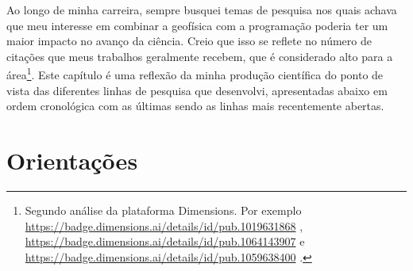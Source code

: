 \documentclass[10pt,a4paper,oneside]{book}
\begin{document}
Ao longo de minha carreira, sempre busquei temas de pesquisa nos quais achava
que meu interesse em combinar a geofísica com a programação poderia ter um
maior impacto no avanço da ciência.
Creio que isso se reflete no número de citações que meus trabalhos geralmente
recebem, que é considerado alto para a área\footnote{Segundo análise da
  plataforma Dimensions. Por exemplo
  \url{https://badge.dimensions.ai/details/id/pub.1019631868} \citep{Uieda2012},
  \url{https://badge.dimensions.ai/details/id/pub.1064143907} \citep{Uieda2016} e
  \url{https://badge.dimensions.ai/details/id/pub.1059638400} \citep{Uieda2017}.
}.
Este capítulo é uma reflexão da minha produção científica do ponto de vista das
diferentes linhas de pesquisa que desenvolvi, apresentadas abaixo em ordem
cronológica com as últimas sendo as linhas mais recentemente abertas.

\section{Orientações}
\label{sec_orientacao}
\end{document}
